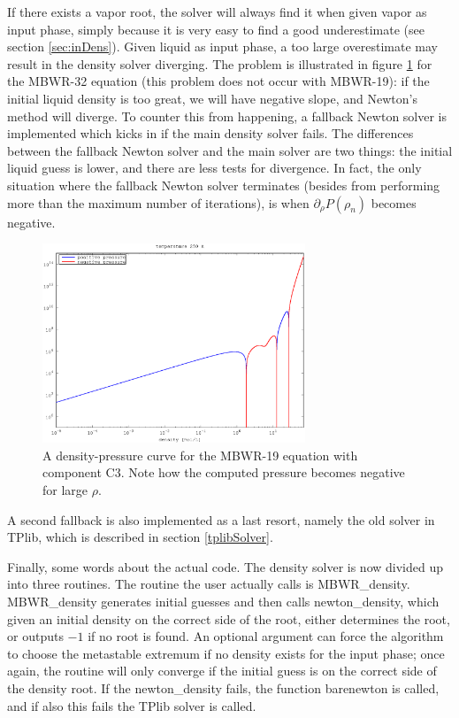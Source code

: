 \documentclass[internal,english]{sintefmemo2012}
\numberwithin{equation}{section}
\begin{document}
If there exists a vapor root, the solver will always find it when
given vapor as input phase, simply because it is very easy to find a
good underestimate (see section \ref{sec:inDens}). Given liquid as
input phase, a too large overestimate may result in the density solver
diverging. The problem is illustrated in figure \ref{liqGoesDown} for the MBWR-32
equation (this problem does not occur with MBWR-19): if the initial liquid
density is too great, we will have negative slope, and Newton's method
will diverge. To counter this from happening, a fallback Newton solver
is implemented which kicks in if the main density solver fails. The
differences between the fallback Newton solver and the main
solver are two things: the initial liquid guess is lower, and there
are less tests for divergence. In fact, the only situation where the
fallback Newton solver terminates (besides from performing more than
the maximum number of iterations), is when $\partial_\rho P(\rho_n)$
becomes negative.
\begin{figure}[h]
  \centering
  \includegraphics[width=0.7\textwidth]{figures/C3_liqGoesDown.eps}
  \caption{A density-pressure curve for the MBWR-19 equation with
    component C$3$. Note how the computed pressure becomes negative
    for large $\rho$.}
  \label{liqGoesDown}
\end{figure}
A second fallback is also implemented as a last resort, namely the old
solver in TPlib, which is described in section \ref{tplibSolver}.

Finally, some words about the actual code. The density solver is now
divided up into three routines. The routine the user actually calls is
MBWR\_density. MBWR\_density generates initial guesses and then calls
newton\_density, which given an initial density on the correct
side of the root, either determines the root, or outputs $-1$ if no
root is found. An optional argument can force the algorithm to choose
the metastable extremum if no density exists for the input phase; once
again, the routine will only converge if the initial guess is on the
correct side of the density root. If the newton\_density fails, the
function barenewton is called, and if also this fails the TPlib solver
is called.
\end{document}
